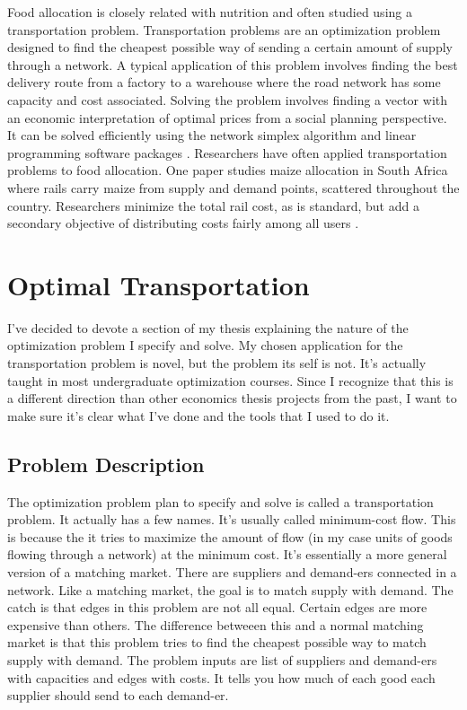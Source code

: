 \documentclass{report}
\begin{document}
Food allocation is closely related with nutrition and often studied using a transportation problem. Transportation problems are an optimization problem designed to find the cheapest possible way of sending a certain amount of supply through a network. A typical application of this problem involves finding the best delivery route from a factory to a warehouse where the road network has some capacity and cost associated. Solving the problem involves finding a vector with an economic interpretation of optimal prices from a social planning perspective. It can be solved efficiently using the network simplex algorithm and linear programming software packages \cite{Cook}. Researchers have often applied transportation problems to food allocation. One paper studies maize allocation in South Africa where rails carry maize from supply and demand points, scattered throughout the country. Researchers minimize the total rail cost, as is standard, but add a secondary objective of distributing costs fairly among all users \cite{Stewart}.

\section{Optimal Transportation}

I've decided to devote a section of my thesis explaining the nature of the optimization problem I specify and solve. My chosen application for the transportation problem is novel, but the problem its self is not. It's actually taught in most undergraduate optimization courses\cite{Cook}. Since I recognize that this is a different direction than other economics thesis projects from the past, I want to make sure it's clear what I've done and the tools that I used to do it.

\subsection{Problem Description}

The optimization problem plan to specify and solve is called a transportation problem. It actually has a few names. It's usually called minimum-cost flow. This is because the it tries to maximize the amount of flow (in my case units of goods flowing through a network) at the minimum cost. It's essentially a more general version of a matching market. There are suppliers and demand-ers connected in a network. Like a matching market, the goal is to match supply with demand. The catch is that edges in this problem are not all equal. Certain edges are more expensive than others. The difference betweeen this and a normal matching market is that this problem tries to find the cheapest possible way to match supply with demand. The problem inputs are list of suppliers and demand-ers with capacities and edges with costs. It tells you how much of each good each supplier should send to each demand-er.
\end{document}
